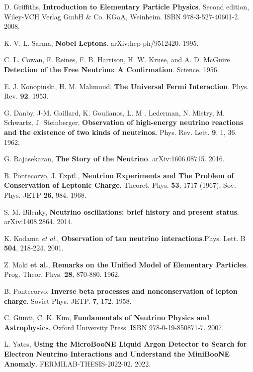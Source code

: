  D. Griffiths, \textbf{Introduction to Elementary Particle Physics}. Second edition, Wiley-VCH Verlag GmbH \& Co. KGaA, Weinheim. ISBN 978-3-527-40601-2. 2008.

 K. V. L. Sarma, \textbf{Nobel Leptons}. arXiv:hep-ph/9512420. 1995.

 C. L. Cowan, F. Reines, F. B. Harrison, H. W. Kruse, and A. D. McGuire. \textbf{Detection of the Free Neutrino: A Confirmation}. Science. 1956.

 E. J. Konopinski, H. M. Mahmoud, \textbf{The Universal Fermi Interaction}. Phys. Rev. \textbf{92}. 1953.

 G. Danby, J-M. Gaillard, K. Goulianos, L. M . Lederman, N. Mistry, M. Schwartz, J. Steinberger, \textbf{Observation of high-energy neutrino reactions and the existence of two kinds of neutrinos.} Phys. Rev. Lett. \textbf{9}, 1, 36. 1962.

 G. Rajasekaran, \textbf{The Story of the Neutrino}. arXiv:1606.08715. 2016.

 B. Pontecorvo, J. Exptl., \textbf{Neutrino Experiments and The Problem of Conservation of Leptonic Charge}. Theoret. Phys. \textbf{53}, 1717 (1967), Sov. Phys. JETP \textbf{26}, 984. 1968.

 S. M. Bilenky, \textbf{Neutrino oscillations: brief history and present status}. arXiv:1408.2864. 2014.

K. Kodama \textit{et al.}, \textbf{Observation of tau neutrino interactions}.Phys. Lett. B \textbf{504}, 218-224. 2001. 

 Z. Maki \textbf{et al.}, \textbf{Remarks on the Unified Model of Elementary Particles}. Prog. Theor. Phys. \textbf{28}, 870-880. 1962.

 B. Pontecorvo, \textbf{Inverse beta processes and nonconservation of lepton charge}. Soviet Phys. JETP. \textbf{7}, 172. 1958.

 C. Giunti, C. K. Kim, \textbf{Fundamentals of Neutrino Physics and Astrophysics}. Oxford University Press. ISBN 978-0-19-850871-7. 2007.

 L. Yates, \textbf{Using the MicroBooNE Liquid Argon Detector
to Search for Electron Neutrino Interactions and Understand the MiniBooNE Anomaly}. FERMILAB-THESIS-2022-02. 2022.

